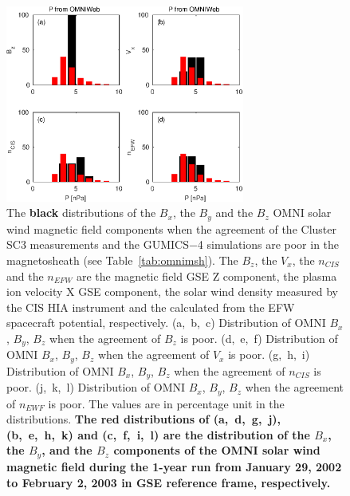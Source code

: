 \documentclass[linenumbers,draft]{agujournal}
\begin{document}
\begin{figure}[h]
\centering
\includegraphics[width=0.7\textwidth,angle=0]{swe-2021-corr-f16}
\caption{The \textbf{black} distributions of the $B_{x}$, the $B_{y}$  and the $B_{z}$ OMNI solar wind magnetic field components when the agreement of the Cluster SC3 measurements and the GUMICS$-$4 simulations are poor in the magnetosheath (see Table~\ref{tab:omnimsh}). The $B_{z}$, the $V_{x}$, the $n_{CIS}$ and the $n_{EFW}$ are the magnetic field GSE Z component, the plasma ion velocity X GSE component, the  solar wind density measured by the CIS HIA instrument and the calculated from the EFW spacecraft potential, respectively. (a,~b,~c) Distribution of OMNI $B_{x}$, $B_{y}$, $B_{z}$ when the agreement of $B_{z}$ is poor. (d,~e,~f) Distribution of OMNI  $B_{x}$, $B_{y}$, $B_{z}$ when the agreement of $V_{x}$ is poor. (g,~h,~i) Distribution of OMNI $B_{x}$, $B_{y}$, $B_{z}$ when the agreement of $n_{CIS}$ is poor. (j,~k,~l) Distribution of OMNI $B_{x}$, $B_{y}$, $B_{z}$ when the agreement of $n_{EWF}$ is poor. The values are in percentage unit in the distributions. \textbf{The red distributions of (a,~d,~g,~j), (b,~e,~h,~k) and (c,~f,~i,~l) are the distribution of the $B_{x}$, the $B_{y}$, and the $B_{z}$ components of the OMNI solar wind magnetic field during the 1-year run from January 29, 2002 to February 2, 2003 in GSE reference frame, respectively.}}
\label{fig:mshomnibxyz}
\end{figure}

\pagebreak
\end{document}
